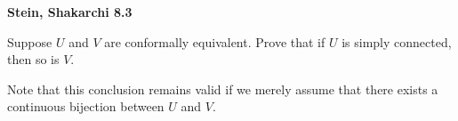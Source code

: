 \textbf{Stein, Shakarchi 8.3}

Suppose $U$ and $V$ are conformally equivalent. Prove that if $U$ is simply connected, then so is $V$.

Note that this conclusion remains valid if we merely assume that there exists a continuous bijection between $U$ and 
$V$.

\begin{solution}
  \ \\
\end{solution}

